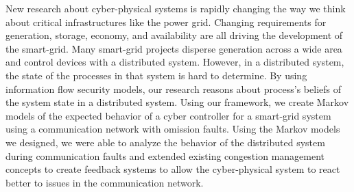 New research about cyber-physical systems is rapidly changing the way we think about critical infrastructures like the power grid.
Changing requirements for generation, storage, economy, and availability are all driving the development of the smart-grid.
Many smart-grid projects disperse generation across a wide area and control devices with a distributed system. 
However, in a distributed system, the state of the processes in that system is hard to determine.
By using information flow security models, our research reasons about process's beliefs of the system state in a distributed system.
Using our framework, we create Markov models of the expected behavior of a cyber controller for a smart-grid system using a communication network with omission faults.
Using the Markov models we designed, we were able to analyze the behavior of the distributed system during communication faults and extended existing congestion management concepts to create feedback systems to allow the cyber-physical system to react better to issues in the communication network.